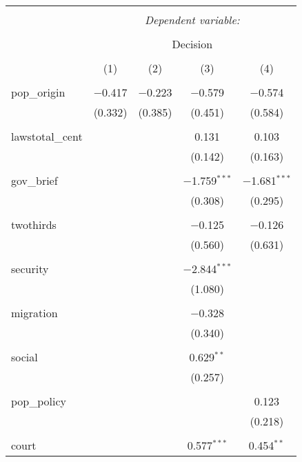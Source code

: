 
\begin{table}[!htbp] \centering 
  \caption{} 
  \label{} 
\begin{tabular}{@{\extracolsep{5pt}}lcccc} 
\\[-1.8ex]\hline 
\hline \\[-1.8ex] 
 & \multicolumn{4}{c}{\textit{Dependent variable:}} \\ 
\cline{2-5} 
\\[-1.8ex] & \multicolumn{4}{c}{Decision} \\ 
\\[-1.8ex] & (1) & (2) & (3) & (4)\\ 
\hline \\[-1.8ex] 
 pop\_origin & $-$0.417 & $-$0.223 & $-$0.579 & $-$0.574 \\ 
  & (0.332) & (0.385) & (0.451) & (0.584) \\ 
  & & & & \\ 
 lawstotal\_cent &  &  & 0.131 & 0.103 \\ 
  &  &  & (0.142) & (0.163) \\ 
  & & & & \\ 
 gov\_brief &  &  & $-$1.759$^{***}$ & $-$1.681$^{***}$ \\ 
  &  &  & (0.308) & (0.295) \\ 
  & & & & \\ 
 twothirds &  &  & $-$0.125 & $-$0.126 \\ 
  &  &  & (0.560) & (0.631) \\ 
  & & & & \\ 
 security &  &  & $-$2.844$^{***}$ &  \\ 
  &  &  & (1.080) &  \\ 
  & & & & \\ 
 migration &  &  & $-$0.328 &  \\ 
  &  &  & (0.340) &  \\ 
  & & & & \\ 
 social &  &  & 0.629$^{**}$ &  \\ 
  &  &  & (0.257) &  \\ 
  & & & & \\ 
 pop\_policy &  &  &  & 0.123 \\ 
  &  &  &  & (0.218) \\ 
  & & & & \\ 
 court &  &  & 0.577$^{***}$ & 0.454$^{**}$ \\ 

\end{tabular}
\end{table}
